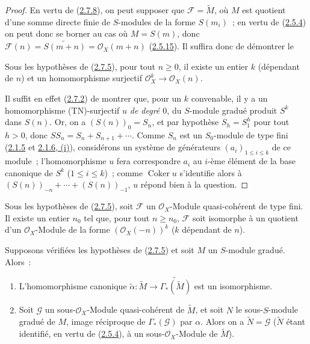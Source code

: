 \begin{proof}
En vertu de (\hyperref[II.2.7.8-fr]{2.7.8}), on peut supposer que
$\mathcal{F}=\widetilde{M}$, où $M$ est quotient d'une somme directe finie de
$S$-modules de la forme $S(m_i)$~; en vertu de
(\hyperref[II.2.5.4-fr]{2.5.4}) on peut donc se borner au cas où $M=S(m)$,
donc $\mathcal{F}(n)=\widetilde{S(m+n)}
=\mathcal{O}_X(m+n)$ (\hyperref[II.2.5.15-fr]{2.5.15}). Il suffira donc de
démontrer le

\begin{lemma}[2.7.9.1]
\label{II.2.7.9.1-fr}
Sous les hypothèses de (\hyperref[II.2.7.5-fr]{2.7.5}), pour tout $n\geq0$,
il existe un entier $k$ (dépendant de $n$) et un homomorphisme surjectif
$\mathcal{O}_X^k\to\mathcal{O}_X(n)$.
\end{lemma}

Il suffit en effet (\hyperref[II.2.7.2-fr]{2.7.2}) de montrer que, pour un $k$
convenable, il y a un homomorphisme (TN)-surjectif $u$ \emph{de degré $0$},
du $S$-module gradué produit $S^k$ dans $S(n)$. Or, on a $(S(n))_0=S_n$, et
par hypothèse $S_h=S_1^h$ pour tout $h>0$, donc
$SS_n=S_n+S_{n+1}+\cdots$. Comme $S_n$ est un $S_0$-module de type fini
(\hyperref[II.2.1.5-fr]{2.1.5} et
\hyperref[II.2.1.6-fr]{2.1.6, (i)}), considérons un système de générateurs
$(a_i)_{1\leq i\leq k}$ de ce module~; l'homomorphisme $u$ fera correspondre
$a_i$ au $i$-ème élément de la base canonique de $S^k$ ($1\leq i\leq k$)~;
comme $\operatorname{Coker}u$ s'identifie alors à
$(S(n))_{-n}+\cdots+(S(n))_{-1}$, $u$ répond bien à la question.
\end{proof}

\begin{corollary}[2.7.10]
\label{II.2.7.10-fr}
Sous les hypothèses de (\hyperref[II.2.7.5-fr]{2.7.5}), soit $\mathcal{F}$ un
$\mathcal{O}_X$-Module quasi-cohérent de type fini. Il existe un entier $n_0$
tel que, pour tout $n\geq n_0$, $\mathcal{F}$ soit isomorphe à un quotient
d'un $\mathcal{O}_X$-Module de la forme $(\mathcal{O}_X(-n))^k$ ($k$
dépendant de $n$).
\end{corollary}

\begin{proposition}[2.7.11]
\label{II.2.7.11-fr}
Supposons vérifiées les hypothèses de
(\hyperref[II.2.7.5-fr]{2.7.5}) et soit $M$ un $S$-module gradué. Alors~:
\begin{enumerate}
  \item[\rm(i)] L'homomorphisme canonique
    $\widetilde{\alpha}:\widetilde{M}\to
    \widetilde{\Gamma_*(\widetilde{M})}$ est un isomorphisme.
  \item[\rm(ii)] Soit $\mathcal{G}$ un sous-$\mathcal{O}_X$-Module
    quasi-cohérent de $\widetilde{M}$, et soit $N$ le sous-$S$-module gradué
    de $M$, image réciproque de $\Gamma_*(\mathcal{G})$ par $\alpha$. Alors
    on a $\widetilde{N}=\mathcal{G}$ ($\widetilde{N}$ étant identifié, en
    vertu de (\hyperref[II.2.5.4-fr]{2.5.4}), à un
    sous-$\mathcal{O}_X$-Module de $\widetilde{M}$).
\end{enumerate}
\end{proposition}

